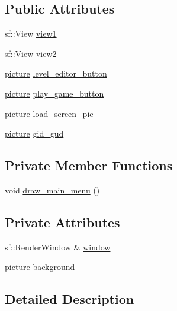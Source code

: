 \subsection*{Public Attributes}
\begin{DoxyCompactItemize}
\item 
sf\+::\+View \hyperlink{classmain__menu_a673d7133b0bbaf357bd1578830545352}{view1}
\item 
sf\+::\+View \hyperlink{classmain__menu_aa3d65353a385ba3e32800335cafef315}{view2}
\item 
\hyperlink{classpicture}{picture} \hyperlink{classmain__menu_a33ab93a1dbb2117179aa7f92e7c75b57}{level\+\_\+editor\+\_\+button}
\item 
\hyperlink{classpicture}{picture} \hyperlink{classmain__menu_ac1da4a5a730e90c687bbe6cf368308ad}{play\+\_\+game\+\_\+button}
\item 
\hyperlink{classpicture}{picture} \hyperlink{classmain__menu_a614132486d879a486991e992ed6ba9a5}{load\+\_\+screen\+\_\+pic}
\item 
\hyperlink{classpicture}{picture} \hyperlink{classmain__menu_a5c77a4d3087e15c767029c9d55d7f4e6}{gid\+\_\+gud}
\end{DoxyCompactItemize}
\subsection*{Private Member Functions}
\begin{DoxyCompactItemize}
\item 
void \hyperlink{classmain__menu_a2f5aeef38a566a25311f77bc24b8c8b5}{draw\+\_\+main\+\_\+menu} ()
\end{DoxyCompactItemize}
\subsection*{Private Attributes}
\begin{DoxyCompactItemize}
\item 
sf\+::\+Render\+Window \& \hyperlink{classmain__menu_aa3c11885ae695ba18f0b1c48cd4012c5}{window}
\item 
\hyperlink{classpicture}{picture} \hyperlink{classmain__menu_a322ab524817b0c59d040962cef7c7295}{background}
\end{DoxyCompactItemize}


\subsection{Detailed Description}


